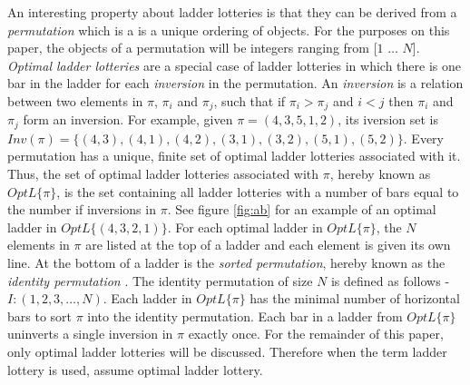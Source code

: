 An interesting property about ladder lotteries is that they can be derived from a 
\emph{permutation} which is a is a unique ordering of objects.
For the purposes on this paper, the objects of a permutation will be integers 
ranging from [$1$ $\dots$ $N$]. \emph{Optimal ladder lotteries} are a special case of ladder 
lotteries in which there is one bar in the ladder for each \emph{inversion} in the permutation.
An \emph{inversion} is a relation between two elements in $\pi$, 
$\pi_{i}$ and $\pi_{j}$, such that if $\pi_{i}>\pi_{j}$ and $i<j$ then $\pi_{i}$ and $\pi_{j}$ 
form an inversion. 
For example, given $\pi=(4,3,5,1,2)$, its iversion set is $Inv(\pi) =\{(4,3),(4,1),(4,2),(3,1),(3,2),(5,1),(5,2)\}$.
Every permutation has a unique, finite set of optimal ladder lotteries associated with it. 
 Thus, the set of optimal ladder lotteries associated with $\pi$, 
 hereby known as \emph{$OptL\{\pi\}$}, is the set containing all ladder lotteries 
 with a number of bars equal to the number if inversions in $\pi$. 
 See figure \ref{fig:ab} for an example of an optimal ladder in $OptL\{(4,3,2,1)\}$.
 For each optimal ladder in $OptL\{\pi\}$, the $N$ 
 elements in $\pi$ are listed at the top of a ladder and each 
 element is given its own line. 
 At the bottom of a ladder is the \emph{sorted permutation}, 
 hereby known as the \emph{identity permutation} \cite{A7}. 
 The  identity permutation of size $N$ is defined as follows - $I:(1, 2, 3, \dots, N)$. 
 Each ladder in $OptL\{\pi\}$ has the minimal number of horizontal bars to sort $\pi$ 
 into the identity permutation. Each bar in a ladder from $OptL\{\pi\}$ uninverts a single 
 inversion in $\pi$ exactly once. For the remainder of this paper, only optimal ladder 
 lotteries will be discussed. Therefore when the term ladder lottery is used, assume 
 optimal ladder lottery.\par
 
